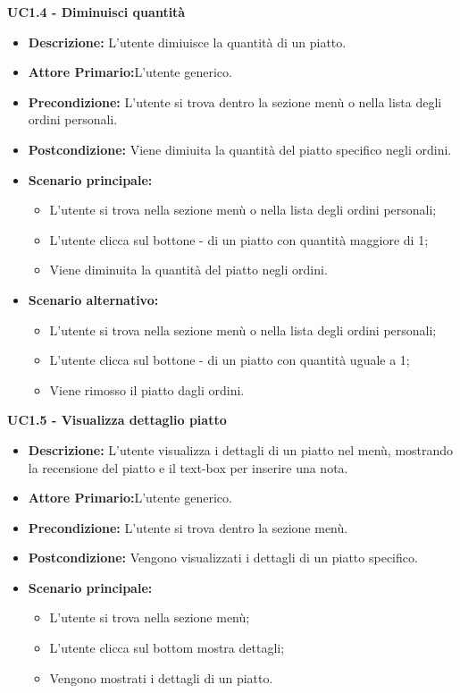 \textbf{UC1.4 - Diminuisci quantità}
\begin{itemize}
    \item \textbf{Descrizione:} L'utente dimiuisce la quantità di un piatto.
    \item \textbf{Attore Primario:}L'utente generico.
    \item \textbf{Precondizione:} L'utente si trova dentro la sezione menù o nella lista degli ordini personali.
    \item \textbf{Postcondizione:} Viene dimiuita la quantità del piatto specifico negli ordini.
    \item \textbf{Scenario principale:}
    \begin{itemize}
        \item L'utente si trova nella sezione menù o nella lista degli ordini personali;
        \item L'utente clicca sul bottone - di un piatto con quantità maggiore di 1;
        \item Viene diminuita la quantità del piatto negli ordini.
    \end{itemize}
    \item \textbf{Scenario alternativo:}
    \begin{itemize}
        \item L'utente si trova nella sezione menù o nella lista degli ordini personali;
        \item L'utente clicca sul bottone - di un piatto con quantità uguale a 1;
        \item Viene rimosso il piatto dagli ordini.
    \end{itemize}
\end{itemize}
\textbf{UC1.5 - Visualizza dettaglio piatto}
\begin{itemize}
    \item \textbf{Descrizione:} L'utente visualizza i dettagli di un piatto nel menù, mostrando la recensione del piatto e il text-box per inserire una nota.
    \item \textbf{Attore Primario:}L'utente generico.
    \item \textbf{Precondizione:} L'utente si trova dentro la sezione menù.
    \item \textbf{Postcondizione:} Vengono visualizzati i dettagli di un piatto specifico.
    \item \textbf{Scenario principale:}  
    \begin{itemize}
        \item L'utente si trova nella sezione menù;
        \item L'utente clicca sul bottom mostra dettagli;
        \item Vengono mostrati i dettagli di un piatto.
    \end{itemize}
\end{itemize}
